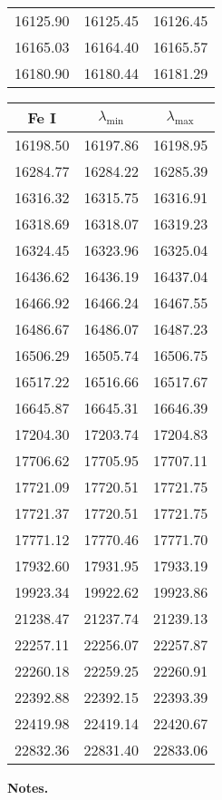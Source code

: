 \documentclass{article}
\begin{document}
\begin{table}[h!]
\begin{minipage}[t]{.4\linewidth}
\begin{center}
\begin{tabular}{ccc}
          16125.90 & 16125.45 & 16126.45 \\
          16165.03 & 16164.40 & 16165.57 \\
          16180.90 & 16180.44 & 16181.29 \\
          \hline
      \end{tabular}
  \end{center} 
  \end{minipage} 
  \hspace{2.cm}
  \begin{minipage}[t]{.4\linewidth}
  \begin{center}
     \begin{tabular}{ccc}
          \hline
      \hline
      Fe I & $\lambda_{\mathrm{min}}$ & $\lambda_{\mathrm{max}}$ \\
      \hline
      16198.50 & 16197.86 & 16198.95 \\
      16284.77 & 16284.22 & 16285.39 \\
      16316.32 & 16315.75 & 16316.91 \\
      16318.69 & 16318.07 & 16319.23 \\
      16324.45 & 16323.96 & 16325.04 \\
      16436.62 & 16436.19 & 16437.04 \\
      16466.92 & 16466.24 & 16467.55 \\
      16486.67 & 16486.07 & 16487.23 \\
      16506.29 & 16505.74 & 16506.75 \\
      16517.22 & 16516.66 & 16517.67 \\
      16645.87 & 16645.31 & 16646.39 \\
      17204.30 & 17203.74 & 17204.83 \\
      17706.62 & 17705.95 & 17707.11 \\
      17721.09 & 17720.51 & 17721.75 \\
      17721.37 & 17720.51 & 17721.75 \\
      17771.12 & 17770.46 & 17771.70 \\
      17932.60 & 17931.95 & 17933.19 \\
      19923.34 & 19922.62 & 19923.86 \\
      21238.47 & 21237.74 & 21239.13 \\
      22257.11 & 22256.07 & 22257.87 \\
      22260.18 & 22259.25 & 22260.91 \\
      22392.88 & 22392.15 & 22393.39 \\
      22419.98 & 22419.14 & 22420.67 \\
      22832.36 & 22831.40 & 22833.06 \\
          \hline
      \end{tabular}
    \end{center}
  \end{minipage}
  \vspace{0.3cm}
  
  \textbf{Notes.}
  \end{table}
\end{document}
